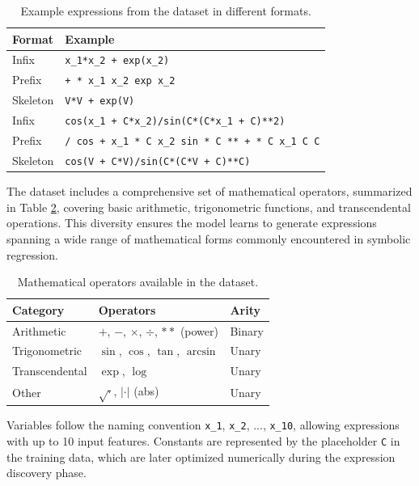 \begin{table}[h!]
    \centering
    \caption{Example expressions from the dataset in different formats.}
    \label{tab:dataset_examples}
    \begin{tabular}{p{2.5cm}p{10cm}}
    \toprule
    \textbf{Format} & \textbf{Example} \\
    \midrule
    Infix & \texttt{x\_1*x\_2 + exp(x\_2)} \\
    Prefix & \texttt{+ * x\_1 x\_2 exp x\_2} \\
    Skeleton & \texttt{V*V + exp(V)} \\
    \midrule
    Infix & \texttt{cos(x\_1 + C*x\_2)/sin(C*(C*x\_1 + C)**2)} \\
    Prefix & \texttt{/ cos + x\_1 * C x\_2 sin * C ** + * C x\_1 C C} \\
    Skeleton & \texttt{cos(V + C*V)/sin(C*(C*V + C)**C)} \\
    \bottomrule
    \end{tabular}
\end{table}

The dataset includes a comprehensive set of mathematical operators, summarized in Table \ref{tab:operators}, covering basic arithmetic, trigonometric functions, and transcendental operations. This diversity ensures the model learns to generate expressions spanning a wide range of mathematical forms commonly encountered in symbolic regression.

\begin{table}[h!]
    \centering
    \caption{Mathematical operators available in the dataset.}
    \label{tab:operators}
    \begin{tabular}{lll}
    \toprule
    \textbf{Category} & \textbf{Operators} & \textbf{Arity} \\
    \midrule
    Arithmetic & $+$, $-$, $\times$, $\div$, $**$ (power) & Binary \\
    Trigonometric & $\sin$, $\cos$, $\tan$, $\arcsin$ & Unary \\
    Transcendental & $\exp$, $\log$ & Unary \\
    Other & $\sqrt{\cdot}$, $|\cdot|$ (abs) & Unary \\
    \bottomrule
    \end{tabular}
\end{table}

Variables follow the naming convention \texttt{x\_1}, \texttt{x\_2}, ..., \texttt{x\_10}, allowing expressions with up to 10 input features. Constants are represented by the placeholder \texttt{C} in the training data, which are later optimized numerically during the expression discovery phase.


